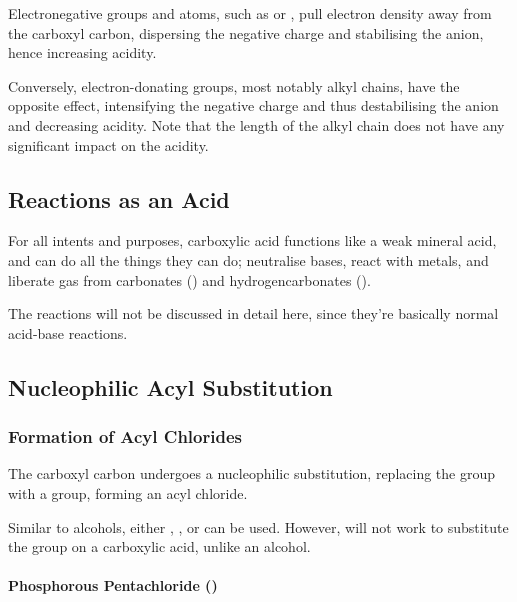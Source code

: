 				Electronegative groups and atoms, such as \ch{\Cl} or , pull electron density away from the carboxyl carbon,
				dispersing the negative charge and stabilising the anion, hence increasing acidity.

				Conversely, electron-donating groups, most notably alkyl chains, have the opposite effect, intensifying the negative charge
				and thus destabilising the anion and decreasing acidity. Note that the length of the alkyl chain does not have any significant
				impact on the acidity.



		\subsection{Reactions as an Acid}

			For all intents and purposes, carboxylic acid functions like a weak mineral acid, and can do all the things they can do;
			neutralise bases, react with metals, and liberate  gas from carbonates () and hydrogencarbonates ().

			The reactions will not be discussed in detail here, since they're basically normal acid-base reactions.



		\pagebreak
		\subsection{Nucleophilic Acyl Substitution}

			\subsubsection{Formation of Acyl Chlorides}

				The carboxyl carbon undergoes a nucleophilic substitution, replacing the  group with a \ch{\Cl} group, forming
				an acyl chloride.

				Similar to alcohols, either , , or  can be used. However,  will
				not work to substitute the  group on a carboxylic acid, unlike an alcohol.


				\paragraph{Phosphorous Pentachloride ()}

